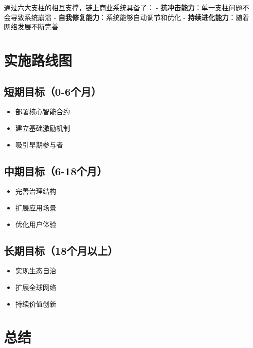 \documentclass[
  Letterpaper,
]{scrbook}
\providecommand{\tightlist}{%
  \setlength{\itemsep}{0pt}\setlength{\parskip}{0pt}}
\begin{document}
通过六大支柱的相互支撑，链上商业系统具备了： -
\textbf{抗冲击能力}：单一支柱问题不会导致系统崩溃 -
\textbf{自我修复能力}：系统能够自动调节和优化 -
\textbf{持续进化能力}：随着网络发展不断完善

\section{实施路线图}\label{ux5b9eux65bdux8defux7ebfux56fe}

\subsection{短期目标（0-6个月）}\label{ux77edux671fux76eeux68070-6ux4e2aux6708}

\begin{itemize}
\tightlist
\item
  部署核心智能合约
\item
  建立基础激励机制
\item
  吸引早期参与者
\end{itemize}

\subsection{中期目标（6-18个月）}\label{ux4e2dux671fux76eeux68076-18ux4e2aux6708}

\begin{itemize}
\tightlist
\item
  完善治理结构
\item
  扩展应用场景
\item
  优化用户体验
\end{itemize}

\subsection{长期目标（18个月以上）}\label{ux957fux671fux76eeux680718ux4e2aux6708ux4ee5ux4e0a}

\begin{itemize}
\tightlist
\item
  实现生态自治
\item
  扩展全球网络
\item
  持续价值创新
\end{itemize}

\section{总结}\label{ux603bux7ed3}
\end{document}
